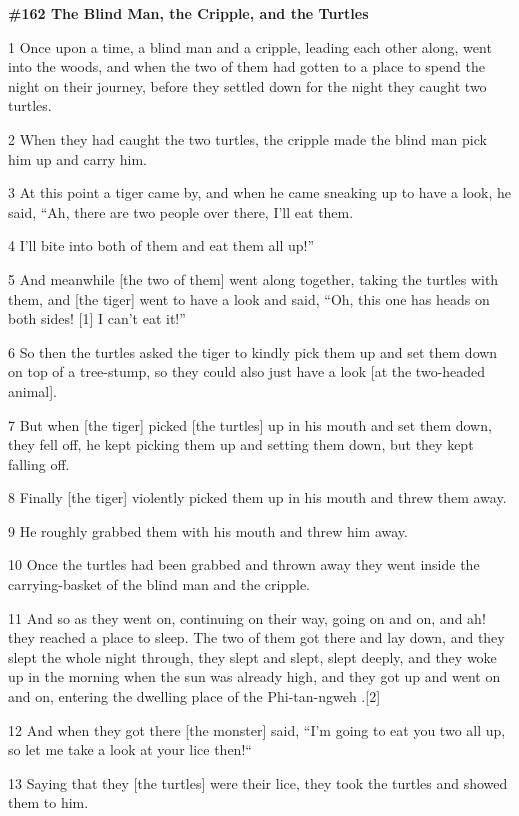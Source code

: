 
{\LARGE{}\textbf{\#162 The Blind Man, the Cripple, and the Turtles}}

{\LARGE{}1 Once upon a time, a blind man and a cripple, leading each other along,
went into the woods, and when the two of them had gotten to a place to spend the
night on their journey, before they settled down for the night they caught two
turtles.}

{\LARGE{}2 When they had caught the two turtles, the cripple made the blind man
pick him up and carry him.}

{\LARGE{}3 At this point a tiger came by, and when he came sneaking up to have
a look, he said, ``Ah, there are two people over there, I'll eat them.}

{\LARGE{}4 I'll bite into both of them and eat them all up!''}

{\LARGE{}5 And meanwhile [the two of them] went along together, taking the turtles
with them, and [the tiger] went to have a look and said, ``Oh, this one has heads
on both sides! [1]  I can't eat it!''}

{\LARGE{}6 So then the turtles asked the tiger to kindly pick them up and set them
down on top of a tree-stump, so they could also just have a look [at the two-headed
animal].}

{\LARGE{}7 But when [the tiger] picked [the turtles] up in his mouth and set them
down, they fell off, he kept picking them up and setting them down, but they kept
falling off.}

{\LARGE{}8 Finally [the tiger] violently picked them up in his mouth and threw
them away.}

{\LARGE{}9 He roughly grabbed them with his mouth and threw him away.}

{\LARGE{}10 Once the turtles had been grabbed and thrown away they went inside
the carrying-basket of the blind man and the cripple.}

{\LARGE{}11 And so as they went on, continuing on their way, going on and on, and
ah! they reached a place to sleep. The two of them got there and lay down, and
they slept the whole night through, they slept and slept, slept deeply, and they
woke up in the morning when the sun was already high, and they got up and went
on and on, entering the dwelling place of the Phi-tan-ngweh .[2]}

{\LARGE{}12 And when they got there [the monster] said, ``I'm going to eat you
two all up, so let me take a look at your lice then!``}

{\LARGE{}13 Saying that they [the turtles] were their lice, they took the turtles
and showed them to him.}

